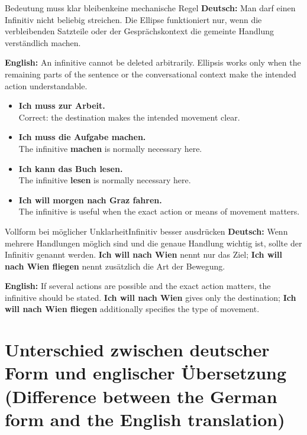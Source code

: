 \documentclass[a4paper,11pt]{article}
\newcommand{\GermanText}[1]{\textbf{Deutsch: }#1\par}
\newcommand{\EnglishText}[1]{{\small\color{SoftGray}\textbf{English: }#1\par}}
\newcommand{\ExampleItem}[2]{\item \textbf{#1}\\{\small\color{SoftGray}#2}}
\begin{document}
        \begin{grammarentry}{Bedeutung muss klar bleiben}{keine mechanische Regel}
            \GermanText{Man darf einen Infinitiv nicht beliebig streichen. Die Ellipse funktioniert nur, wenn die verbleibenden Satzteile oder der Gesprächskontext die gemeinte Handlung verständlich machen.}
            \EnglishText{An infinitive cannot be deleted arbitrarily. Ellipsis works only when the remaining parts of the sentence or the conversational context make the intended action understandable.}
        \end{grammarentry}

        \begin{exbox}
            \begin{itemize}
                \ExampleItem{Ich muss zur Arbeit.}{Correct: the destination makes the intended movement clear.}
                \ExampleItem{Ich muss die Aufgabe machen.}{The infinitive \textbf{machen} is normally necessary here.}
                \ExampleItem{Ich kann das Buch lesen.}{The infinitive \textbf{lesen} is normally necessary here.}
                \ExampleItem{Ich will morgen nach Graz fahren.}{The infinitive is useful when the exact action or means of movement matters.}
            \end{itemize}
        \end{exbox}

        \begin{grammarentry}{Vollform bei möglicher Unklarheit}{Infinitiv besser ausdrücken}
            \GermanText{Wenn mehrere Handlungen möglich sind und die genaue Handlung wichtig ist, sollte der Infinitiv genannt werden. \textbf{Ich will nach Wien} nennt nur das Ziel; \textbf{Ich will nach Wien fliegen} nennt zusätzlich die Art der Bewegung.}
            \EnglishText{If several actions are possible and the exact action matters, the infinitive should be stated. \textbf{Ich will nach Wien} gives only the destination; \textbf{Ich will nach Wien fliegen} additionally specifies the type of movement.}
        \end{grammarentry}

    \section{Unterschied zwischen deutscher Form und englischer Übersetzung \textnormal{(Difference between the German form and the English translation)}}
\end{document}
